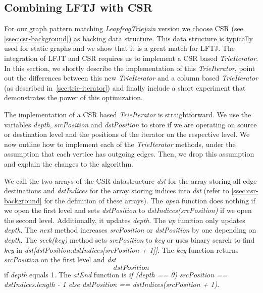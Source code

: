 \subsection{Combining \textsc{LFTJ} with \textsc{CSR}}
For our graph pattern matching \textit{LeapfrogTriejoin} version we choose \textsc{CSR} (see \cref{ssec:csr-background}) as backing
data structure.
This data structure is typically used for static graphs and we show that it is a great match for \textsc{LFTJ}.
The integration of \textsc{LFJT} and \textsc{CSR} requires us to implement a \textsc{CSR} based \textit{TrieIterator}.
In this section, we shortly describe the implementation of this \textit{TrieIterator}, point out the differences between this new
\textit{TrieIterator} and a column based \textit{TrieIterator} (as described in~\cref{sec:trie-iterator}) and finally include a short
experiment that demonstrates the power of this optimization.

The implementation of a \textsc{CSR} based \textit{TrieIterator} is straightforward.
We use the variables \textit{depth}, \textit{srcPosition} and \textit{dstPosition} to store if we are operating on source or destination
level and the positions of the iterator on the respective level.
We now outline how to implement each of the \textit{TrieIterator} methods, under the assumption that each vertice has outgoing edges.
Then, we drop this assumption and explain the changes to the algorithm.

We call the two arrays of the \textsc{CSR} datastructure \textit{dst} for the array storing all edge destinations and \textit{dstIndices}
for the array storing indices into \textit{dst} (refer to \cref{ssec:csr-background} for the definition of these arrays).
The \textit{open} function does nothing if we open the first level and sets \textit{dstPosition} to \textit{dstIndices(srcPosition)} if
we open the second level.
Additionally, it updates \textit{depth}.
The \textit{up} function only updates \textit{depth}.
The \textit{next} method increases \textit{srcPosition} or \textit{dstPosition} by one depending on \textit{depth}.
The \textit{seek(key)} method sets \textit{srcPosition} to \textit{key} or uses binary search to find \textit{key} in
\textit{dst[dstPosition:dstIndices[srcPosition + 1]]}.
The \textit{key} function returns \textit{srcPosition} on the first level and \textit{dst\[dstPosition\]} if \textit{depth} equals 1.
The \textit{atEnd} function is \textit{if (depth == 0) srcPosition == dstIndices.length - 1 else dstPosition == dstIndices(srcPosition +
1)}.

